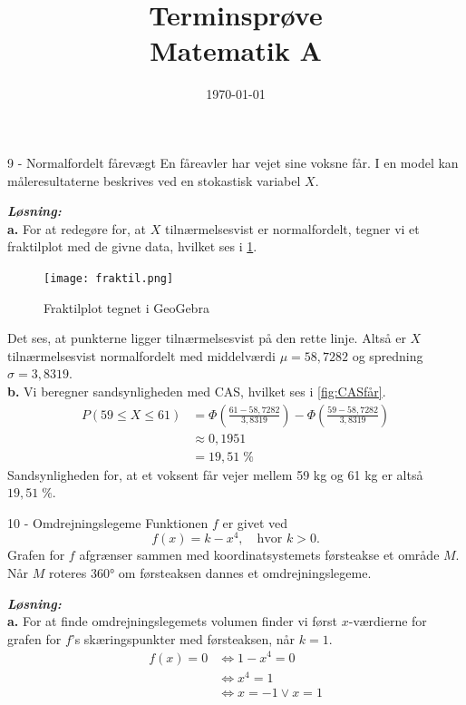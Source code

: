 \documentclass{article}
\title{Terminsprøve\\
{\Large \textbf{Matematik A}}}
\date{\today}
\newcommand{\sol}{\setlength{\parindent}{0cm}\textbf{\textit{Løsning:}}\setlength{\parindent}{1cm}}
\begin{document}
\maketitle
\newpage
\begin{question*}{9 - Normalfordelt fårevægt}{}
  En fåreavler har vejet sine voksne får.
  I en model kan måleresultaterne beskrives ved en stokastisk variabel $X$.
\end{question*}
\sol \\
\textbf{a.}
For at redegøre for, at $X$ tilnærmelsesvist er normalfordelt, tegner vi et fraktilplot med de givne data, hvilket ses i \cref{fig:fraktil}. 
\begin{figure}[H]
\begin{center}
  \texttt{[image: fraktil.png]}
\end{center}
\caption{Fraktilplot tegnet i GeoGebra}
\label{fig:fraktil}
\end{figure}
Det ses, at punkterne ligger tilnærmelsesvist på den rette linje.
Altså er $X$ tilnærmelsesvist normalfordelt med middelværdi $\mu =58,7282$ og spredning $\sigma = 3,8319$. \\[1ex]
\textbf{b.}
Vi beregner sandsynligheden med CAS, hvilket ses i \cref{fig:CASfår}.
\begin{equation*}
\begin{split}
  P(59 \leq X \leq 61) &= \Phi \left(\frac{61-58,7282}{3,8319}\right) - \Phi \left(\frac{59-58,7282}{3,8319}\right) \\
  &\approx 0,1951 \\
  &=19,51 \;\%
\end{split}
\end{equation*}
Sandsynligheden for, at et voksent får vejer mellem 59 kg og 61 kg er altså $19,51 \;\%$.
\begin{question*}{10 - Omdrejningslegeme}{}
Funktionen $f$ er givet ved
\[
f(x) = k - x^4, \quad \text{hvor } k > 0.
\] 
Grafen for $f$ afgrænser sammen med koordinatsystemets førsteakse et område $M$.
Når $M$ roteres 360° om førsteaksen dannes et omdrejningslegeme.
\end{question*}
\sol \\
\textbf{a.}
For at finde omdrejningslegemets volumen finder vi først $x$-værdierne for grafen for $f$'s skæringspunkter med førsteaksen, når $k=1$.
\begin{equation*}
\begin{split}
  f(x)= 0 &\iff 1-x^4 =0 \\
  &\iff x^4=1 \\
  &\iff x=-1 \lor x=1
\end{split}
\end{equation*}
\end{document}
